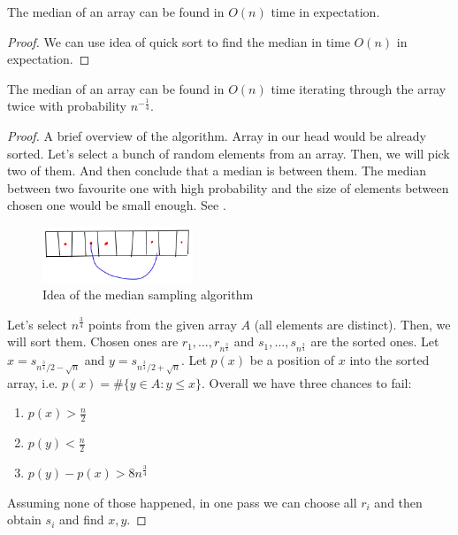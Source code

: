 \begin{theorem}
    The median of an array can be found in $O(n)$ time in expectation.
\end{theorem}
\begin{proof}
    We can use idea of quick sort to find the median in time $O(n)$ in expectation.
\end{proof}
\begin{theorem}
    The median of an array can be found in $O(n)$ time iterating through the array twice with probability $n^{-\frac14}$.
\end{theorem}
\begin{proof}
    A brief overview of the algorithm.
    Array in our head would be already sorted.
    Let's select a bunch of random elements from an array.
    Then, we will pick two of them.
    And then conclude that a median is between them.
    The median between two favourite one with high probability and the size of elements between chosen one would be small enough.
    See .
\begin{figure}[H]
    \centering
    \includegraphics[width=0.4\textwidth]{figures/D7E283AF-ED41-46DC-8260-F52E8EFD658D}
    \caption{Idea of the median sampling algorithm}
    \label{fig:d7e283af-ed41-46dc-8260-f52e8efd658d}
\end{figure}
    Let's select $n^{\frac 3 4}$ points from the given array $A$ (all elements are distinct).
    Then, we will sort them.
    Chosen ones are $r_1, \ldots, r_{n^{\frac 3 4}}$ and $s_1, \ldots, s_{n^{\frac 3 4}}$ are the sorted ones.
    Let $x = s_{n^{\frac 3 4}/2 - \sqrt n}$ and $y = s_{n^{\frac 3 4}/2 + \sqrt n}$.
    Let $p(x)$ be a position of $x$ into the sorted array, i.e. $p(x) = \#\{y \in A \colon y \leq x\}$.
    Overall we have three chances to fail:
    \begin{enumerate}
        \item \label{itm:selecting_1} $p(x) > \frac n 2$
        \item \label{itm:selecting_2} $p(y) < \frac n 2$
        \item $p(y) - p(x) > 8 n^{\frac 3 4}$
    \end{enumerate}
    Assuming none of those happened, in one pass we can choose all $r_i$ and then obtain $s_i$ and find $x, y$.

\end{proof}
